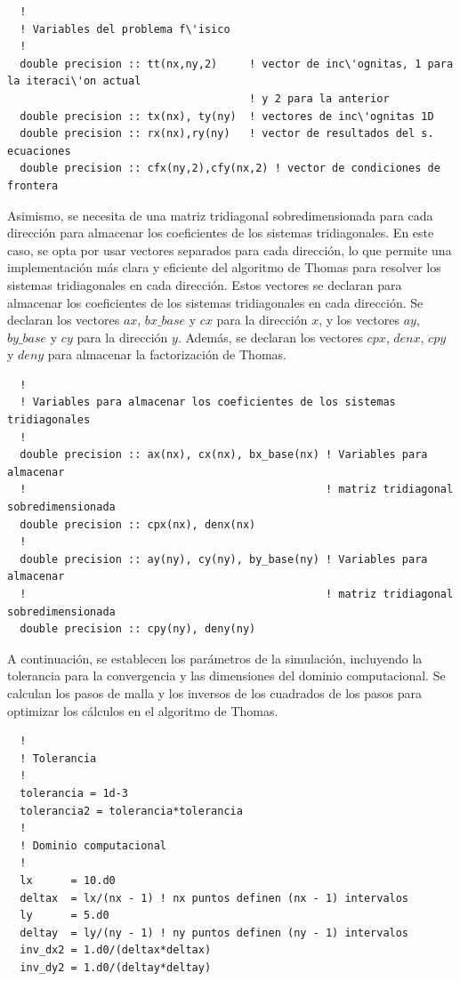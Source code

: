 \documentclass[11pt,a4paper]{article}
\begin{document}
\begin{verbatim}
  !
  ! Variables del problema f\'isico
  !
  double precision :: tt(nx,ny,2)     ! vector de inc\'ognitas, 1 para la iteraci\'on actual 
                                      ! y 2 para la anterior
  double precision :: tx(nx), ty(ny)  ! vectores de inc\'ognitas 1D
  double precision :: rx(nx),ry(ny)   ! vector de resultados del s. ecuaciones
  double precision :: cfx(ny,2),cfy(nx,2) ! vector de condiciones de frontera
\end{verbatim}

Asimismo, se necesita de una matriz tridiagonal sobredimensionada para cada direcci\'on
para almacenar los coeficientes de los sistemas tridiagonales. En este caso, se opta por usar 
vectores separados para cada dirección, lo que permite una implementación más 
clara y eficiente del algoritmo de Thomas para resolver los sistemas 
tridiagonales en cada dirección. Estos vectores se declaran para
almacenar los coeficientes de los sistemas tridiagonales en cada dirección. 
Se declaran los vectores $ax$, $bx\_base$ y $cx$ para la dirección $x$, y los 
vectores $ay$, $by\_base$ y $cy$ para la dirección $y$. Además, se declaran los 
vectores $cpx$, $denx$, $cpy$ y $deny$ para almacenar la factorización de Thomas.

\begin{verbatim}
  !
  ! Variables para almacenar los coeficientes de los sistemas tridiagonales
  !
  double precision :: ax(nx), cx(nx), bx_base(nx) ! Variables para almacenar
  !                                               ! matriz tridiagonal sobredimensionada
  double precision :: cpx(nx), denx(nx)
  !
  double precision :: ay(ny), cy(ny), by_base(ny) ! Variables para almacenar
  !                                               ! matriz tridiagonal sobredimensionada
  double precision :: cpy(ny), deny(ny)
\end{verbatim}

A continuación, se establecen los parámetros de la simulación, incluyendo la 
tolerancia para la convergencia y las dimensiones del dominio computacional. 
Se calculan los pasos de malla y los inversos de los cuadrados de los pasos 
para optimizar los cálculos en el algoritmo de Thomas.

\begin{verbatim}
  !
  ! Tolerancia
  !
  tolerancia = 1d-3
  tolerancia2 = tolerancia*tolerancia
  !
  ! Dominio computacional
  !
  lx      = 10.d0
  deltax  = lx/(nx - 1) ! nx puntos definen (nx - 1) intervalos
  ly      = 5.d0
  deltay  = ly/(ny - 1) ! ny puntos definen (ny - 1) intervalos
  inv_dx2 = 1.d0/(deltax*deltax)
  inv_dy2 = 1.d0/(deltay*deltay)
\end{verbatim}
\end{document}

